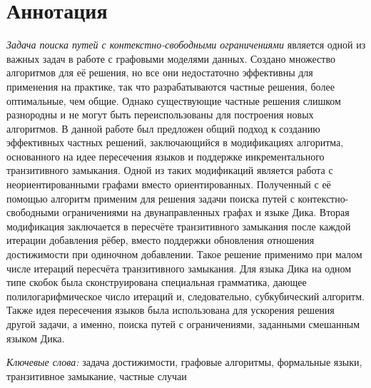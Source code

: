 \section*{Аннотация}

\textit{Задача поиска путей с контекстно-свободными ограничениями} является одной из важных задач в работе с графовыми моделями данных. Создано множество алгоритмов для её решения, но все они недостаточно эффективны для применения на практике, так что разрабатываются частные решения, более оптимальные, чем общие. Однако существующие частные решения слишком разнородны и не могут быть переиспользованы для построения новых алгоритмов. В данной работе был предложен общий подход к созданию эффективных частных решений, заключающийся в модификациях алгоритма, основанного на идее пересечения языков и поддержке инкрементального транзитивного замыкания. Одной из таких модификаций является работа с неориентированными графами вместо ориентированных. Полученный с её помощью алгоритм применим для решения задачи поиска путей с контекстно-свободными ограничениями на двунаправленных графах и языке Дика. Вторая модификация заключается в пересчёте транзитивного замыкания после каждой итерации добавления рёбер, вместо поддержки обновления отношения достижимости при одиночном добавлении. Такое решение применимо при малом числе итераций пересчёта транзитивного замыкания. Для языка Дика на одном типе скобок была сконструирована специальная грамматика, дающее полилогарифмическое число итераций и, следовательно, субкубический алгоритм. Также идея пересечения языков была использована для ускорения решения другой задачи, а именно, поиска путей с ограничениями, заданными смешанным языком Дика.

\vspace{1em}

\textit{Ключевые слова:} задача достижимости, графовые алгоритмы, формальные языки, транзитивное замыкание, частные случаи

\pagebreak

